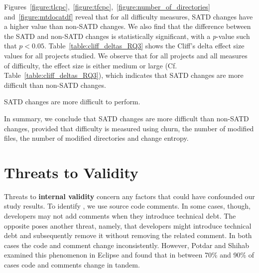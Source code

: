  Figures~\ref{figure:tlcpc},~\ref{figure:tfcpc},~\ref{figure:number_of_directories} and~\ref{figure:mtdocatdf} reveal that for all difficulty measures, SATD changes have a higher value than non-SATD changes. We also find that the difference between the SATD and non-SATD changes is statistically significant, with a \textit{p}-value such that $p < 0.05$. Table~\ref{table:cliff_deltas_RQ3} shows the Cliff's delta effect size values for all projects studied. We observe that for all projects and all measures of difficulty, the effect size is either medium or large (Cf. Table~\ref{table:cliff_deltas_RQ3}), which indicates that SATD changes are more difficult than non-SATD changes.

\begin{myboxii}
	SATD changes are more difficult to perform.
\end{myboxii}


In summary, we conclude that SATD changes are more difficult than non-SATD changes, provided that difficulty is measured using churn, the number of modified files, the number of modified directories and change entropy.







\section{Threats to Validity}
\label{chap3:sec:threats_to_validity}

Threats  to {\bf  internal validity}  concern any factors that could have confounded our study results. To identify \SATD, we use source code comments. In some cases, though, developers may not add comments when they introduce technical debt. The opposite poses another threat, namely, that developers might introduce technical debt and subsequently remove it without removing the related comment. In both cases the code and comment change inconsistently. However, Potdar and Shihab~\cite{ICSM_PotdarS14} examined this phenomenon in Eclipse and found that in between 70\% and 90\% of cases code and comments change in tandem.

